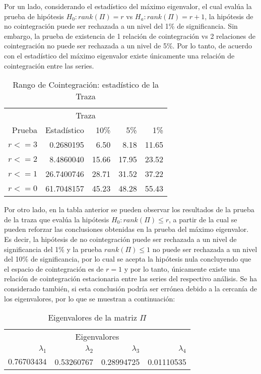 Por un lado, considerando  el estadístico del máximo eigenvalor, el cual evalúa la prueba de hipótesis $H_0:rank(\Pi)=r$ vs $H_a:rank(\Pi)=r+1$, la hipótesis de no cointegración puede ser rechazada a un nivel del 1\% de significancia. Sin embargo, la prueba de existencia de 1 relación de cointegración vs 2 relaciones de cointegración no puede ser rechazada a un nivel de 5\%. Por lo tanto, de acuerdo con el estadístico del máximo eigenvalor existe únicamente una relación de cointegración entre las series.

\begin{table}[H]
\begin{center}
    \begin{tabular}{rrrrr}
    \hline
    \multicolumn{5}{c}{Traza} \\
        \cline{1-5}
        Prueba    		& Estadístico 		& 10\% 		& 5\% 		& 1\% \\
        \hline
        $r <= 3$		& 0.2680195		& 6.50		& 8.18		& 11.65    \\
        $r <= 2$		& 8.4860040		& 15.66		& 17.95		& 23.52    \\
        $r <= 1$		& 26.7400746		& 28.71		& 31.52		& 37.22   \\
        $r <= 0$		& 61.7048157		& 45.23		& 48.28		& 55.43   \\
        \hline
    \end{tabular}
\end{center}
\caption {Rango de Cointegración: estadístico de la Traza} \label{tab:traza} 
\end{table}


Por otro lado, en la tabla anterior se pueden observar los resultados de la prueba de la traza que evalúa la hipótesis $H_0: rank(\Pi)\leq r$, a partir de la cual se pueden reforzar las conclusiones obtenidas en la prueba del máximo eigenvalor. Es decir, la hipótesis de no cointegración puede ser rechazada a un nivel de significancia del 1\% y la prueba $rank(\Pi) \leq 1$ no puede ser rechazada a un nivel del 10\% de significancia, por lo cual se acepta la hipótesis nula concluyendo que el espacio de cointegración es de $r=1$ y por lo tanto, únicamente existe una relación de cointegración estacionaria entre las series del respectivo análisis. Se ha considerado también, si esta conclusión podría ser errónea debido a la cercanía de los eigenvalores, por lo que se muestran a continuación:


\begin{table}[H]
\begin{center}
    \begin{tabular}{rrrr}
    \hline
    \multicolumn{4}{c}{Eigenvalores} \\
        \cline{1-4}
        $\lambda_1$    		& $\lambda_2$  		& $\lambda_3$  		& $\lambda_4$ \\
        \hline
        $0.76703434$		& 0.53260767			& 0.28994725			& 0.01110535	   \\
        \hline
    \end{tabular}
\end{center}
\caption {Eigenvalores de la matriz $\Pi$} \label{tab:eigenvalues_list} 
\end{table}


